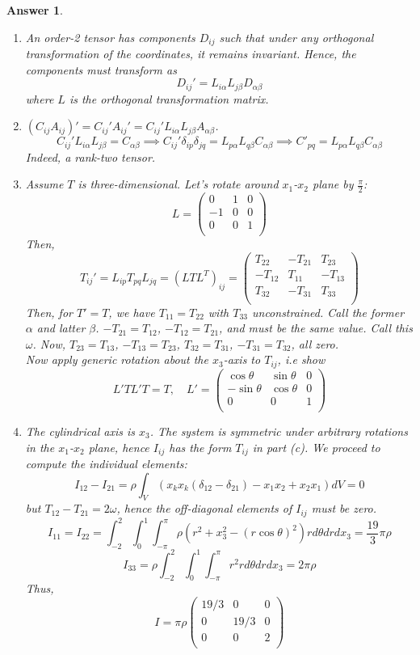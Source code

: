 \documentclass[a4paper]{article}
\newtheorem{ans}{Answer}[section]
\theoremstyle{new}
\begin{document}
\newpage
\begin{ans}\leavevmode
\begin{enumerate}[label=(\alph*)]
\item An order-2 tensor has components $D_{ij}$ such that under any orthogonal transformation of the coordinates, it remains invariant. Hence, the components must transform as
$$D_{ij}'=L_{i\alpha}L_{j\beta}D_{\alpha\beta}$$
where $L$ is the orthogonal transformation matrix.
\item $(C_{ij}A_{ij})'=C_{ij}'A_{ij}'=C_{ij}'L_{i\alpha}L_{j\beta}A_{\alpha\beta}$.
$$C_{ij}'L_{i\alpha}L_{j\beta}=C_{\alpha\beta}\implies C_{ij}'\delta_{ip}\delta_{jq}=L_{p\alpha}L_{q\beta}C_{\alpha\beta}\implies C'_{pq}=L_{p\alpha}L_{q\beta}C_{\alpha\beta}$$
Indeed, a rank-two tensor.
\item Assume $T$ is three-dimensional. Let's rotate around $x_1$-$x_2$ plane by $\frac{\pi}{2}$:
$$L=\begin{pmatrix}0&1&0\\-1&0&0\\0&0&1\\\end{pmatrix}$$
Then, 
$$T_{ij}'=L_{ip}T_{pq}L_{jq}=(LTL^T)_{ij}=\begin{pmatrix}T_{22}&-T_{21}&T_{23}\\-T_{12}&T_{11}&-T_{13}\\T_{32}&-T_{31}&T_{33}\\\end{pmatrix}$$
Then, for $T'=T$, we have $T_{11}=T_{22}$ with $T_{33}$ unconstrained. Call the former $\alpha$ and latter $\beta$. $-T_{21}=T_{12}$, $-T_{12}=T_{21}$, and must be the same value. Call this $\omega$. Now, $T_{23}=T_{13}$, $-T_{13}=T_{23}$, $T_{32}=T_{31}$, $-T_{31}=T_{32}$, all zero.\\[5pt]
Now apply generic rotation about the $x_3$-axis to $T_{ij}$, i.e show
$$L'TL'T=T,\quad L'=\begin{pmatrix}\cos\theta &\sin\theta&0\\-\sin\theta&\cos\theta&0\\0&0&1\\\end{pmatrix}$$
\item The cylindrical axis is $x_3$. The system is symmetric under arbitrary rotations in the $x_1$-$x_2$ plane, hence $I_{ij}$ has the form $T_{ij}$ in part (c). We proceed to compute the individual elements:
$$I_{12}-I_{21}=\rho\int_V(x_kx_k(\delta_{12}-\delta_{21})-x_1x_2+x_2x_1)dV=0$$
but $T_{12}-T_{21}=2\omega$, hence the off-diagonal elements of $I_{ij}$ must be zero.
$$I_{11}=I_{22}=\int_{-2}^2\int_0^1\int_{-\pi}^\pi\rho(r^2+x_3^2-(r\cos\theta)^2)r d\theta dr dx_3=\frac{19}{3}\pi\rho$$
$$I_{33}=\rho\int_{-2}^2\int_0^1\int_{-\pi}^\pi r^2rd\theta dr dx_3=2\pi\rho$$
Thus,
$$I=\pi\rho\begin{pmatrix}19/3&0&0\\0&19/3&0\\0&0&2\\\end{pmatrix}$$
\end{enumerate}
\end{ans}
\end{document}
